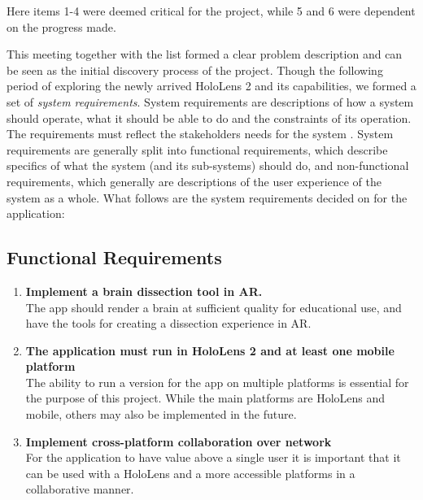 
Here items 1-4 were deemed critical for the project, while 5 and 6 were dependent on the progress made.

This meeting together with the list formed a clear problem description and can be seen as the initial discovery process of the project. Though the following period of exploring the newly arrived HoloLens 2 and its capabilities, we formed a set of \textit{system requirements}. 
System requirements are descriptions of how a system should operate, what it should be able to do and the constraints of its operation. The requirements must reflect the stakeholders needs for the system \citep{PUboka}. System requirements are generally split into functional requirements, which describe specifics of what the system (and its sub-systems) should do, and non-functional requirements, which generally are descriptions of the user experience of the system as a whole. 
What follows are the system requirements decided on for the application: 

\subsection*{Functional Requirements}
\begin{enumerate}
    \item {
        \textbf{Implement a brain dissection tool in AR.}\\
        The app should render a brain at sufficient quality for educational use, and have the tools for creating a dissection experience in AR.
        
    }
    \item {
        \textbf{The application must run in HoloLens 2 and at least one mobile platform}\\
        The ability to run a version for the app on multiple platforms is essential for the purpose of this project. While the main platforms are HoloLens and mobile, others may also be implemented in the future. 
    }

    \item {
        \textbf{Implement cross-platform collaboration over network}\\
        For the application to have value above a single user it is important that it can be used with a HoloLens and a more accessible platforms in a collaborative manner. 
    }


\end{enumerate}

